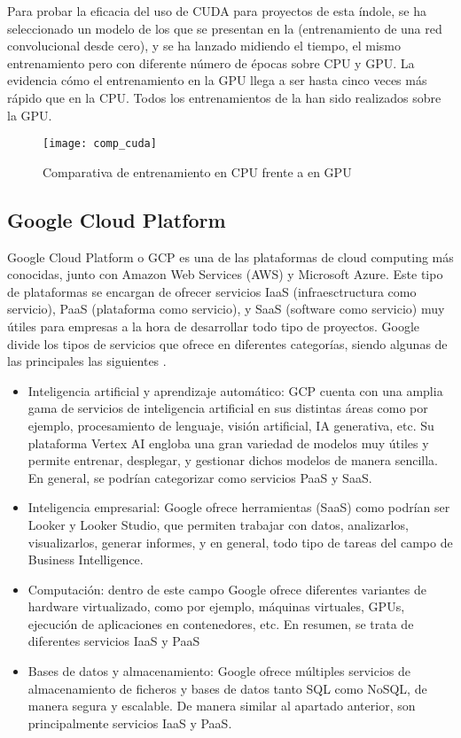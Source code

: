 			Para probar la eficacia del uso de CUDA para proyectos de esta índole, se ha seleccionado un modelo de los que se presentan en la  (entrenamiento de una red convolucional desde cero), y se ha lanzado midiendo el tiempo, el mismo entrenamiento pero con diferente número de épocas sobre CPU y GPU. La  evidencia cómo el entrenamiento en la GPU llega a ser hasta cinco veces más rápido que en la CPU. Todos los entrenamientos de la  han sido realizados sobre la GPU. 
			
			\begin{figure}[!h]
				\centering
				\texttt{[image: comp\_cuda]}
				\caption{Comparativa de entrenamiento en CPU frente a en GPU}
				\label{fig:comparativa_cuda}
			\end{figure}
			
		\subsection{Google Cloud Platform}
		
			Google Cloud Platform o GCP es una de las plataformas de cloud computing más conocidas, junto con Amazon Web Services (AWS) y Microsoft Azure. Este tipo de plataformas se encargan de ofrecer servicios IaaS (infraesctructura como servicio), PaaS (plataforma como servicio), y SaaS (software como servicio) muy útiles para empresas a la hora de desarrollar todo tipo de proyectos. Google divide los tipos de servicios que ofrece en diferentes categorías, siendo algunas de las principales las siguientes \cite{gcp}.  
			
			\begin{itemize}
				\item Inteligencia artificial y aprendizaje automático: GCP cuenta con una amplia gama de servicios de inteligencia artificial en sus distintas áreas como por ejemplo, procesamiento de lenguaje, visión artificial, IA generativa, etc. Su plataforma Vertex AI engloba una gran variedad de modelos muy útiles y permite entrenar, desplegar, y gestionar dichos modelos de manera sencilla. En general, se podrían categorizar como servicios PaaS y SaaS. 
				\item Inteligencia empresarial: Google ofrece herramientas (SaaS) como podrían ser Looker y Looker Studio, que permiten trabajar con datos, analizarlos, visualizarlos, generar informes, y en general, todo tipo de tareas del campo de Business Intelligence. 
				\item Computación: dentro de este campo Google ofrece diferentes variantes de hardware virtualizado, como por ejemplo, máquinas virtuales, GPUs, ejecución de aplicaciones en contenedores, etc. En resumen, se trata de diferentes servicios IaaS y PaaS
				\item Bases de datos y almacenamiento: Google ofrece múltiples servicios de almacenamiento de ficheros y bases de datos tanto SQL como NoSQL, de manera segura y escalable. De manera similar al apartado anterior, son principalmente servicios IaaS y PaaS. 
			\end{itemize}
			
